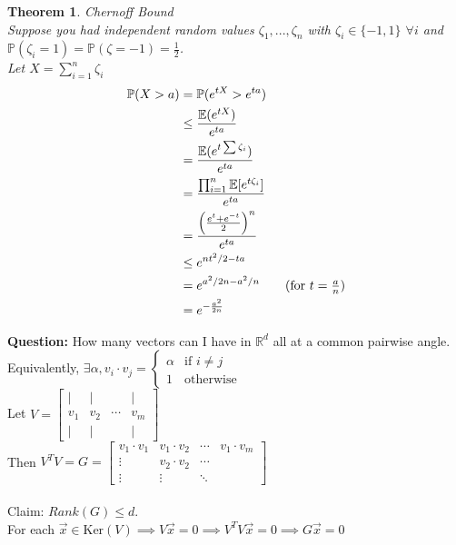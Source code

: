 \documentclass[a4paper]{article}
\newtheorem{thm}{Theorem}[section]
\begin{document}
\begin{thm}
    Chernoff Bound \\
    Suppose you had independent random values $\zeta_1,...,\zeta_n$ with $\zeta_i \in \{-1, 1\}$ $\forall i $ and $\mathbb{P}(\zeta_i=1)=\mathbb{P}(\zeta=-1)=\frac{1}{2}$. \\Let $X=\sum_{i=1}^{n}\zeta_i$
    \begin{align*}
        \mathbb{P}(X>a)&=\mathbb{P}(e^{tX}> e^{ta})\\
        &\leq\frac{\mathbb{E}(e^{tX})}{e^{ta}}\\
        &=\frac{\mathbb{E}(e^{t\sum{\zeta_i}})}{e^{ta}}\\
        &= \frac{\prod_{i=1}^{n}\mathbb{E}[e^{t\zeta_i}]}{e^{ta}}\\
        &=\frac{\left (\frac{e^t+e^{-t}}{2} \right )^n}{e^{ta}}\\
        &\leq e^{nt^2/2-ta}\\
        &=e^{a^2/2n-a^2/n} \tag{for $t=\frac{a}{n}$}\\
        &=e^{-\frac{a^2}{2n}}
    \end{align*}
\end{thm}
 \noindent \textbf{Question: }How many vectors can I have in $\mathbb{R}^d$ all at a common pairwise angle.\\
 Equivalently, $\exists \alpha, v_i\cdot v_j=\begin{cases}
     \alpha & \text{if } i \neq j \\ 1 & \text{otherwise}
 \end{cases}$\\
\noindent Let $V=\begin{bmatrix}
     | & | &  &|\\
     v_1 & v_2 & \cdots & v_m \\
     | & | &  &|
 \end{bmatrix}$\\
 Then $V^TV=G=\begin{bmatrix}
     v_1\cdot v_1 & v_1 \cdot v_2 & \cdots & v_1\cdot v_m \\
     \vdots & v_2\cdot v_2 & \cdots \\
     \vdots & \vdots & \ddots
 \end{bmatrix}$\\\\
 Claim: $Rank(G)\leq d$. \\For each $\Vec{x}\in \text{Ker}(V)\implies V\Vec{x}=0\implies V^TV\Vec{x}=0\implies G\Vec{x}=0$ \\
\end{document}
